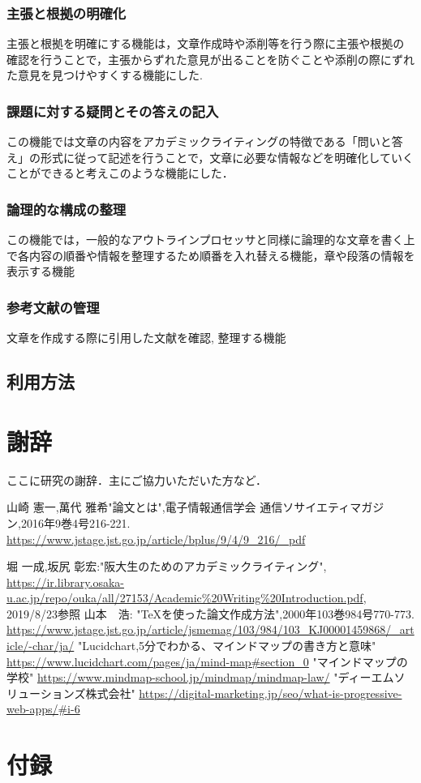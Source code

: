 \documentclass[a4j,12pt]{jarticle}
\begin{document}
\subsubsection{主張と根拠の明確化}
主張と根拠を明確にする機能は，文章作成時や添削等を行う際に主張や根拠の確認を行うことで，主張からずれた意見が出ることを防ぐことや添削の際にずれた意見を見つけやすくする機能にした.　
\subsubsection{課題に対する疑問とその答えの記入}
この機能では文章の内容をアカデミックライティングの特徴である「問いと答え」の形式に従って記述を行うことで，文章に必要な情報などを明確化していくことができると考えこのような機能にした．
\subsubsection{論理的な構成の整理}
この機能では，一般的なアウトラインプロセッサと同様に論理的な文章を書く上で各内容の順番や情報を整理するため順番を入れ替える機能，章や段落の情報を表示する機能
\subsubsection{参考文献の管理}
文章を作成する際に引用した文献を確認, 整理する機能
\subsection{利用方法}

\newpage

\section*{謝辞}

ここに研究の謝辞．主にご協力いただいた方など．

\newpage
{}
 \begin{thebibliography}{99}
山崎 憲一,萬代 雅希"論文とは",電子情報通信学会 通信ソサイエティマガジン,2016年9巻4号216-221.
\url{https://www.jstage.jst.go.jp/article/bplus/9/4/9_216/_pdf}

 堀 一成,坂尻 彰宏:"阪大生のためのアカデミックライティング",
\url{https://ir.library.osaka-u.ac.jp/repo/ouka/all/27153/Academic%20Writing%20Introduction.pdf}, 2019/8/23参照
 山本　浩: "TeXを使った論文作成方法",2000年103巻984号770-773.
\url{https://www.jstage.jst.go.jp/article/jsmemag/103/984/103_KJ00001459868/_article/-char/ja/}
 "Lucidchart,5分でわかる、マインドマップの書き方と意味"
\url{https://www.lucidchart.com/pages/ja/mind-map#section_0}
 "マインドマップの学校"
\url{https://www.mindmap-school.jp/mindmap/mindmap-law/}
 "ディーエムソリューションズ株式会社"
\url{https://digital-marketing.jp/seo/what-is-progressive-web-apps/#i-6}

\end{thebibliography}
\section*{付録}

\end{document}
